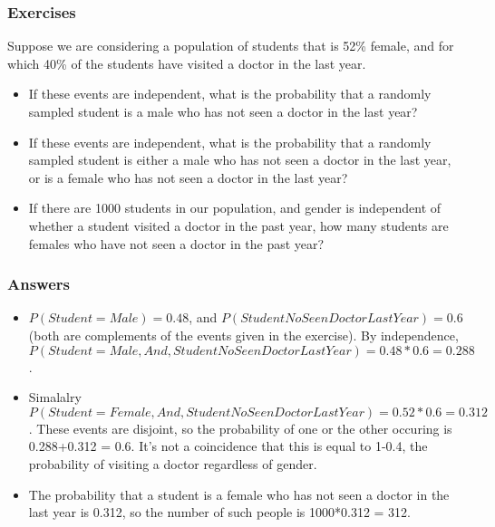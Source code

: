 \begin{frame}
\frametitle{Exercises}

Suppose we are considering a population of students that is 52\%
female, and for which 40\% of the students have visited a doctor in
the last year.

\begin{itemize}

\item If these events are independent, what is the probability that a
  randomly sampled student is a male who has not seen a doctor in the
  last year?

\item If these events are independent, what is the probability that a
  randomly sampled student is either a male who has not seen a doctor
  in the last year, or is a female who has not seen a doctor in the
  last year?

\item If there are 1000 students in our population, and gender is
  independent of whether a student visited a doctor in the past year,
  how many students are females who have not seen a doctor in the past
  year?

\end{itemize}

\end{frame}

\begin{frame}
\frametitle{Answers}


\begin{itemize}

\item $P(Student=Male) = 0.48$, and $P(StudentNoSeenDoctorLastYear) = 0.6$ (both are complements of the events given in the exercise).  By
  independence, $P(Student=Male,And,StudentNoSeenDoctorLastYear) = 0.48*0.6 = 0.288$.

\item Simalalry $P(Student=Female,And,StudentNoSeenDoctorLastYear) = 0.52*0.6 =
  0.312$.  These events are disjoint, so the probability of one or the
  other occuring is 0.288+0.312 = 0.6.  It's not a coincidence that
  this is equal to 1-0.4, the probability of visiting a doctor
  regardless of gender.

\item The probability that a student is a female who has not seen a
  doctor in the last year is 0.312, so the number of such people is
  1000*0.312 = 312.

\end{itemize}

\end{frame}


